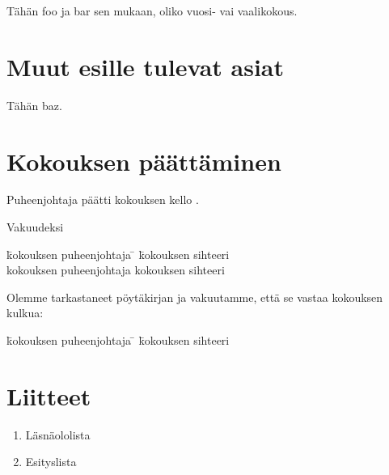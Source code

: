 \documentclass[a4paper,finnish]{article}
\begin{document}
Tähän foo ja bar sen mukaan, oliko vuosi- vai vaalikokous.

\section{Muut esille tulevat asiat}

Tähän baz.

\section{Kokouksen päättäminen}
Puheenjohtaja päätti kokouksen kello \usebox{\loppumisaika}.

\vspace*{1cm}

\begin{minipage}{\textwidth}
Vakuudeksi

\vspace*{1.5cm}

\begin{tabbing}
\hspace*{1.5cm}\=kokouksen puheenjohtaja \= \hspace{1cm} \= kokouksen
sihteeri\kill
\> \usebox{\puhis} \> \> \usebox{\sihteeri}\\
\> kokouksen puheenjohtaja \> \> kokouksen sihteeri
\end{tabbing}

Olemme tarkastaneet pöytäkirjan ja vakuutamme, että se vastaa
kokouksen kulkua:\\

\vspace*{1.5cm}

\begin{tabbing}
\hspace*{1.5cm}\=kokouksen puheenjohtaja \= \hspace{1cm} \= kokouksen
sihteeri\kill
\> \usebox{\tark} \> \> \usebox{\tokatark}\\
\end{tabbing}
\end{minipage}

\section*{Liitteet}
\begin{enumerate}
\item Läsnäololista
\item Esityslista
\end{enumerate}
\end{document}
